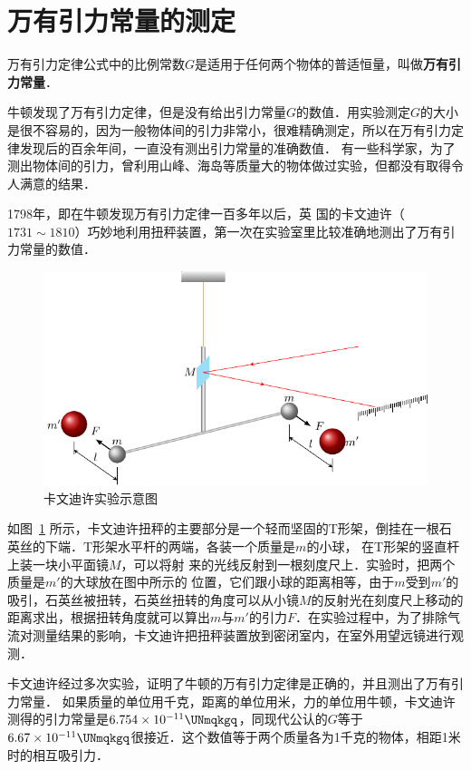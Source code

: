 \section{万有引力常量的测定}
万有引力定律公式中的比例常数$G$是适用于任何两个物体的普适恒量，叫做\textbf{万有引力常量}．

牛顿发现了万有引力定律，但是没有给出引力常量$G$的数值．用实验测定$G$的大小是很不容易的，因为一般物体间的引力非常小，很难精确测定，所以在万有引力定律发现后的百余年间，一直没有测出引力常量的准确数值．
有一些科学家，为了测出物体间的引力，曾利用山峰、海岛等质量大的物体做过实验，但都没有取得令人满意的结果．

1798年，即在牛顿发现万有引力定律一百多年以后，英
国的卡文迪许（$1731 \sim 1810$）巧妙地利用扭秤装置，第一次在实验室里比较准确地测出了万有引力常量的数值．

\begin{figure}[htbp]
	\centering
	\includegraphics{fig/A/5-3.pdf}
	\caption{卡文迪许实验示意图}\label{fig_A_5-3}
\end{figure}

如图~\ref{fig_A_5-3} 所示，卡文迪许扭秤的主要部分是一个轻而坚固的T形架，倒挂在一根石英丝的下端．T形架水平杆的两端，各装一个质量是$m$的小球，
在T形架的竖直杆上装一块小平面镜$M$，可以将射
来的光线反射到一根刻度尺上．实验时，把两个质量是$m'$的大球放在图中所示的
位置，它们跟小球的距离相等，由于$m$受到$m'$的吸引，石英丝被扭转，石英丝扭转的角度可以从小镜$M$的反射光在刻度尺上移动的距离求出，根据扭转角度就可以算出$m$与$m'$的引力$F$．在实验过程中，为了排除气流对测量结果的影响，卡文迪许把扭秤装置放到密闭室内，在室外用望远镜进行观测．

卡文迪许经过多次实验，证明了牛顿的万有引力定律是正确的，并且测出了万有引力常量．
如果质量的单位用千克，距离的单位用米，力的单位用牛顿，卡文迪许测得的引力常量是$6.754\times 10^{-11} \UNmqkgq$，同现代公认的$G$等于$6.67\times 10^{-11}\UNmqkgq$很接近．这个数值等于两个质量各为1千克的物体，相距1米时的相互吸引力．

